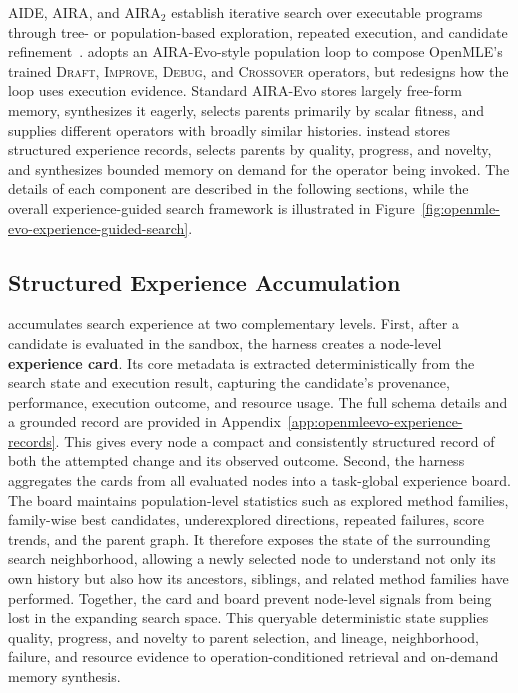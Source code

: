 AIDE, AIRA, and AIRA$_2$ establish iterative search over executable programs through tree- or population-based exploration, repeated execution, and candidate refinement~\citep{jiang2025aide,toledo2025airesearchagents,hambardzumyan2026aira_2}. \openmleevo{} adopts an AIRA-Evo-style population loop to compose OpenMLE's trained \textsc{Draft}, \textsc{Improve}, \textsc{Debug}, and \textsc{Crossover} operators, but redesigns how the loop uses execution evidence. Standard AIRA-Evo stores largely free-form memory, synthesizes it eagerly, selects parents primarily by scalar fitness, and supplies different operators with broadly similar histories. \openmleevo{} instead stores structured experience records, selects parents by quality, progress, and novelty, and synthesizes bounded memory on demand for the operator being invoked. The details of each component are described in the following sections, while the overall experience-guided search framework is illustrated in Figure~\ref{fig:openmle-evo-experience-guided-search}.

\subsection{Structured Experience Accumulation}
\openmleevo{} accumulates search experience at two complementary levels. First, after a candidate is evaluated in the sandbox, the harness creates a node-level \textbf{experience card}. Its core metadata is extracted deterministically from the search state and execution result, capturing the candidate’s provenance, performance, execution outcome, and resource usage. The full schema details and a grounded record are provided in Appendix~\ref{app:openmleevo-experience-records}. This gives every node a compact and consistently structured record of both the attempted change and its observed outcome. Second, the harness aggregates the cards from all evaluated nodes into a task-global experience board. The board maintains population-level statistics such as explored method families, family-wise best candidates, underexplored directions, repeated failures, score trends, and the parent graph. It therefore exposes the state of the surrounding search neighborhood, allowing a newly selected node to understand not only its own history but also how its ancestors, siblings, and related method families have performed. Together, the card and board prevent node-level signals from being lost in the expanding search space. This queryable deterministic state supplies quality, progress, and novelty to parent selection, and lineage, neighborhood, failure, and resource evidence to operation-conditioned retrieval and on-demand memory synthesis.



